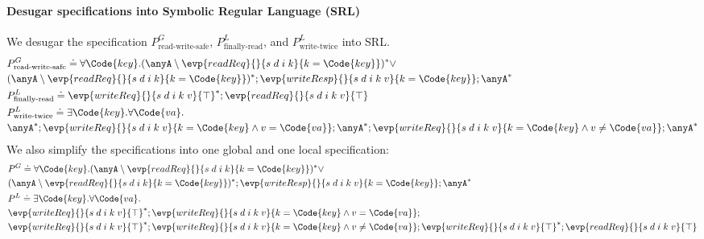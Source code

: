 \paragraph{Desugar specifications into Symbolic Regular Language (SRL)} We desugar the specification $P^{G}_\text{read-write-safe}$, $P^{L}_\text{finally-read}$, and $P^{L}_\text{write-twice}$ into SRL.
{\small\begin{align*}
    &P^{G}_\text{read-write-safe} \doteq \forall \Code{key}. 
    (\anyA \setminus \evp{readReq}{}{s\;d\;i\;k}{k = \Code{key}})^* \lor 
    \\&(\anyA \setminus \evp{readReq}{}{s\;d\;i\;k}{k = \Code{key}})^*; \evp{writeResp}{}{s\;d\;i\;k\;v}{k = \Code{key}};\anyA^*
    \\&P^{L}_\text{finally-read} \doteq \evp{writeReq}{}{s\;d\;i\;k\;v}{\top}^*; \evp{readReq}{}{s\;d\;i\;k\;v}{\top}
    \\&P^{L}_\text{write-twice} \doteq \exists \Code{key}.\forall \Code{va}.
    \\&\anyA^*;\evp{writeReq}{}{s\;d\;i\;k\;v}{k = \Code{key} \land v = \Code{va}};\anyA^*;\evp{writeReq}{}{s\;d\;i\;k\;v}{k = \Code{key} \land v \not= \Code{va}};\anyA^*
\end{align*}}\noindent
We also simplify the specifications into one global and one local specification:
{\small\begin{align*}
    &P^{G} \doteq \forall \Code{key}. 
    (\anyA \setminus \evp{readReq}{}{s\;d\;i\;k}{k = \Code{key}})^* \lor 
    \\&(\anyA \setminus \evp{readReq}{}{s\;d\;i\;k}{k = \Code{key}})^*; \evp{writeResp}{}{s\;d\;i\;k\;v}{k = \Code{key}};\anyA^*
    \\&P^{L} \doteq \exists \Code{key}.\forall \Code{va}. 
    \\&\evp{writeReq}{}{s\;d\;i\;k\;v}{\top}^*;\evp{writeReq}{}{s\;d\;i\;k\;v}{k = \Code{key} \land v = \Code{va}};
    \\&\evp{writeReq}{}{s\;d\;i\;k\;v}{\top}^*;\evp{writeReq}{}{s\;d\;i\;k\;v}{k = \Code{key} \land v \not= \Code{va}};\evp{writeReq}{}{s\;d\;i\;k\;v}{\top}^*;\evp{readReq}{}{s\;d\;i\;k\;v}{\top}
\end{align*}}\noindent

